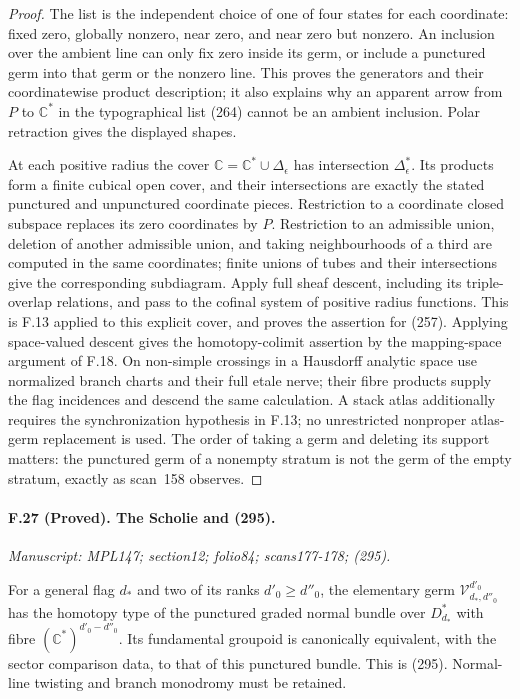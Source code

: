 \begin{proof}
The list is the independent choice of one of four states for each
coordinate: fixed zero, globally nonzero, near zero, and near zero
but nonzero. An inclusion over the ambient line can only fix zero
inside its germ, or include a punctured germ into that germ or the
nonzero line. This proves the generators and their coordinatewise
product description; it also explains why an apparent arrow from
$P$ to $\mathbb C^*$ in the typographical list (264) cannot be an
ambient inclusion. Polar retraction gives the displayed shapes.

At each positive radius the cover
$\mathbb C=\mathbb C^*\cup\Delta_\epsilon$ has intersection
$\Delta_\epsilon^*$. Its products form a finite cubical open cover,
and their intersections are exactly the stated punctured and
unpunctured coordinate pieces. Restriction to a coordinate closed
subspace replaces its zero coordinates by $P$. Restriction to an
admissible union, deletion of another admissible union, and taking
neighbourhoods of a third are computed in the same coordinates;
finite unions of tubes and their intersections give the corresponding
subdiagram. Apply full sheaf descent, including its triple-overlap
relations, and pass to the cofinal system of positive radius
functions. This is F.13 applied to this explicit cover, and proves
the assertion for (257). Applying space-valued descent gives the
homotopy-colimit assertion by the mapping-space argument of F.18.
On non-simple crossings in a Hausdorff analytic space use normalized
branch charts and their full etale nerve; their fibre products supply
the flag incidences and descend the same calculation. A stack atlas
additionally requires the synchronization hypothesis in F.13; no
unrestricted nonproper atlas-germ replacement is used. The order of taking a germ and deleting
its support matters: the punctured germ of a nonempty stratum is
not the germ of the empty stratum, exactly as scan~158 observes.
\end{proof}

\paragraph{F.27 (Proved). The Scholie and (295).}
\textit{Manuscript: MPL147; section12; folio84; scans177-178; (295).}

For a general flag $d_*$ and two of its ranks $d'_0\geq d''_0$,
the elementary germ $\mathcal V^{d'_0}_{d_*,d''_0}$ has the
homotopy type of the punctured graded normal bundle over
$D_{d_*}^*$ with fibre $(\mathbb C^*)^{d'_0-d''_0}$.
Its fundamental groupoid is canonically equivalent, with the sector
comparison data, to that of this punctured bundle. This is (295).
Normal-line twisting and branch monodromy must be retained.


